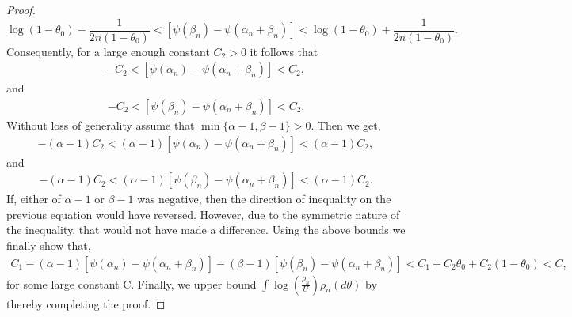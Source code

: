 \documentclass[10pt,a4paper]{amsart}
\begin{document}
\begin{proof}
\begin{equation}
    \log(1-\theta_0)-\frac{1}{2n(1-\theta_0)}<\left[\psi(\beta_n)-\psi(\alpha_n+\beta_n)\right]< \log(1-\theta_0)+\frac{1}{2n(1-\theta_0)}.
\end{equation}
Consequently, for a large enough constant $C_2>0$ it follows that
\begin{align*}
    -C_2<\left[\psi(\alpha_n)-\psi(\alpha_n+\beta_n)\right]< C_2,
\end{align*}
and
\begin{align*}
    -C_2<\left[\psi(\beta_n)-\psi(\alpha_n+\beta_n)\right]< C_2.
\end{align*}
Without loss of generality assume that $\min\{\alpha-1,\beta-1\}>0$. Then we get,
\begin{align*}
    -(\alpha-1)C_2<(\alpha-1)\left[\psi(\alpha_n)-\psi(\alpha_n+\beta_n)\right]< (\alpha-1)C_2,
\end{align*}
and
\begin{align*}
    -(\alpha-1)C_2<(\alpha-1)\left[\psi(\beta_n)-\psi(\alpha_n+\beta_n)\right]< (\alpha-1)C_2.
\end{align*}
If, either of $\alpha-1$ or $\beta-1$ was negative, then the direction of inequality on the previous equation would have reversed. However, due to the symmetric nature of the inequality, that would not have made a difference. Using the above bounds we finally show that, 
\begin{align*}
    C_1-(\alpha-1) \left[\psi(\alpha_n)-\psi(\alpha_n+\beta_n)\right]-(\beta-1)\left[\psi(\beta_n)-\psi(\alpha_n+\beta_n)\right]<C_1+C_2\theta_0+C_2(1-\theta_0)<C,
\end{align*}
for some large constant C. Finally, we upper bound $\int \log\left(\frac{\rho_n}{U}\right)\rho_n(d\theta)$ by  thereby completing the proof.
\end{proof}
\end{document}
